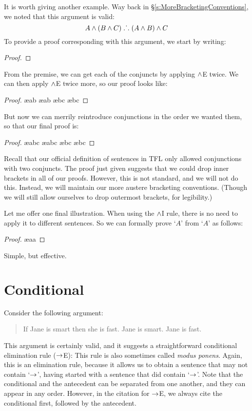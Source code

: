It is worth giving another example. Way back in \S\ref{s:MoreBracketingConventions}, we noted that this argument is valid:
	$$A \wedge (B \wedge C) \mathrel{\ldotp\dot{}\,\ldotp} (A \wedge B) \wedge C$$
To provide a proof corresponding with this argument, we start by writing:
\begin{proof}
\end{proof}
From the premise, we can get each of the conjuncts by applying $\wedge$E twice. We can then apply $\wedge$E twice more, so our proof looks like:
\begin{proof}
	 \ae{ab}
	 \ae{ab}
	 \ae{bc}
	 \ae{bc}
\end{proof}
But now we can merrily reintroduce conjunctions in the order we wanted them, so that our final proof is:
\begin{proof}
	 \ae{abc}
	 \ae{abc}
	 \ae{bc}
	 \ae{bc}
\end{proof}
Recall that our official definition of sentences in TFL only allowed conjunctions with two conjuncts. The proof just given suggests that we could drop inner brackets in all of our proofs. However, this is not standard, and we will not do this. Instead, we will maintain our more austere bracketing conventions. (Though we will still allow ourselves to drop outermost brackets, for legibility.)

Let me offer one final illustration. When using the $\wedge$I rule, there is no need to apply it to different sentences. So we can formally prove `$A$' from `$A$' as follows:
\begin{proof}
	\ae{aa}
\end{proof}
Simple, but effective.

\section{Conditional}
Consider the following argument:
	\begin{quote}
		If Jane is smart then she is fast. Jane is smart. \therefore Jane is fast.
	\end{quote}
This argument is certainly valid, and it suggests a straightforward conditional elimination rule ($\rightarrow$E):
This rule is also sometimes called \emph{modus ponens}. Again, this is an elimination rule, because it allows us to obtain a sentence that may not contain `$\rightarrow$', having started with a sentence that did contain `$\rightarrow$'. Note that the conditional and the antecedent can be separated from one another, and they can appear in any order. However, in the citation for $\rightarrow$E, we always cite the conditional first, followed by the antecedent.

